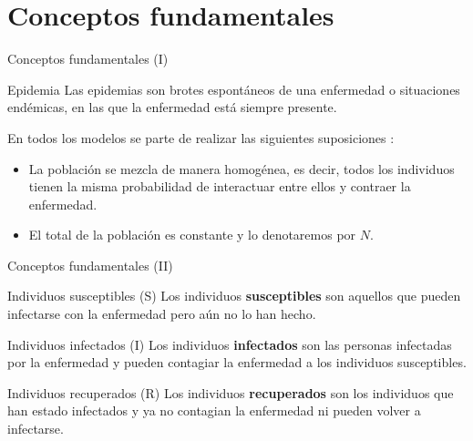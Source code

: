 \section{Conceptos fundamentales}


\begin{frame}{Conceptos fundamentales (I)}

    \begin{block}{Epidemia}
        Las epidemias son brotes espontáneos de una enfermedad o situaciones endémicas, en las que la enfermedad está siempre presente.
    \end{block}  

    \pause

    En todos los modelos se parte de realizar las siguientes suposiciones \cite{allenDiscretetimeSISIR1994}:

    \begin{itemize}
        \item La población se mezcla de manera homogénea, es decir, todos los individuos tienen la misma probabilidad de interactuar entre ellos y contraer la enfermedad.
        \item El total de la población es constante y lo denotaremos por $N$.
    \end{itemize}

\end{frame}


\begin{frame}{Conceptos fundamentales (II)}

    \begin{block}{Individuos susceptibles (S)}
        Los individuos \textbf{susceptibles} son aquellos que pueden infectarse con la enfermedad pero aún no lo han hecho.
    \end{block}  

    \pause

    \begin{block}{Individuos infectados (I)}
        Los individuos \textbf{infectados} son las personas infectadas por la enfermedad y pueden contagiar la enfermedad a los individuos susceptibles.
    \end{block}  

    \pause

    \begin{block}{Individuos recuperados (R)}
        Los individuos \textbf{recuperados} son los individuos que han estado infectados y ya no contagian la enfermedad ni pueden volver a infectarse.
    \end{block}  


\end{frame}


